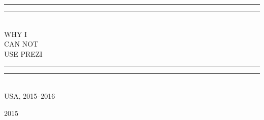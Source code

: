 \newcommand*{\titleGP}{\begingroup %
\centering %
\vspace*{\baselineskip} %

\rule{\textwidth}{1.6pt}\vspace*{-\baselineskip}\vspace*{2pt} %
\rule{\textwidth}{0.4pt}\\[\baselineskip] %

{\LARGE WHY I\\ CAN NOT \\[0.3\baselineskip] USE PREZI\texttrademark}\\[0.2\baselineskip] %

\rule{\textwidth}{0.4pt}\vspace*{-\baselineskip}\vspace{3.2pt} %
\rule{\textwidth}{1.6pt}\\[\baselineskip] %

\scshape %
USA,  2015--2016\par %

\vspace*{2\baselineskip} %


\vfill %

{\scshape 2015} \\[0.3\baselineskip] %

\endgroup}


\thispagestyle{empty} %

\titleGP{} %

